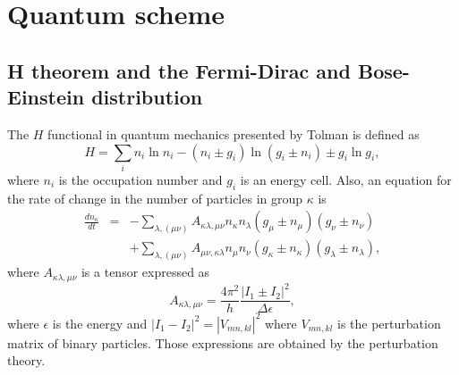 \section{Quantum scheme}\label{sec:quantum}

\subsection{H theorem and the Fermi-Dirac and Bose-Einstein distribution}

The $H$ functional in quantum mechanics presented by Tolman \cite{bib:tolman}
is defined as
%
\begin{equation}\label{quantumh}
    H=\sum_i n_i \ln n_i -(n_i\pm g_i)\ln (g_i \pm n_i)\pm g_i\ln g_i, 
\end{equation}
%
where $n_i$ is the occupation number and $g_i$ is an energy cell. Also, an
equation for the rate of change in the number of particles in group $\kappa$ is
%
\begin{eqnarray}
    \frac{d n_{\kappa}}{dt}&=&-\sum_{\lambda,(\mu \nu)}A_{\kappa\lambda,\mu\nu} n_{\kappa}n_{\lambda}(g_{\mu}\pm n_{\mu})(g_{\nu}\pm n_{\nu})\nonumber \\
    &&+\sum_{\lambda,(\mu \nu)}A_{\mu\nu,\kappa\lambda} n_{\mu}n_{\nu}(g_{\kappa}\pm n_{\kappa})(g_{\lambda}\pm n_{\lambda}),\label{changen}
\end{eqnarray}
%
where $A_{\kappa\lambda,\mu\nu}$ is a tensor expressed as
%
\begin{equation}
  A_{\kappa\lambda,\mu\nu}=\frac{4\pi^{2}}{h}\frac{|I_1\pm I_2|^2}{\Delta \epsilon},
\end{equation}
%
where $\epsilon$ is the energy and $|I_1-I_2|^2=|V_{mn,kl}|^2$ where
$V_{mn,kl}$ is the perturbation matrix of binary particles. Those expressions
are obtained by the perturbation theory.

